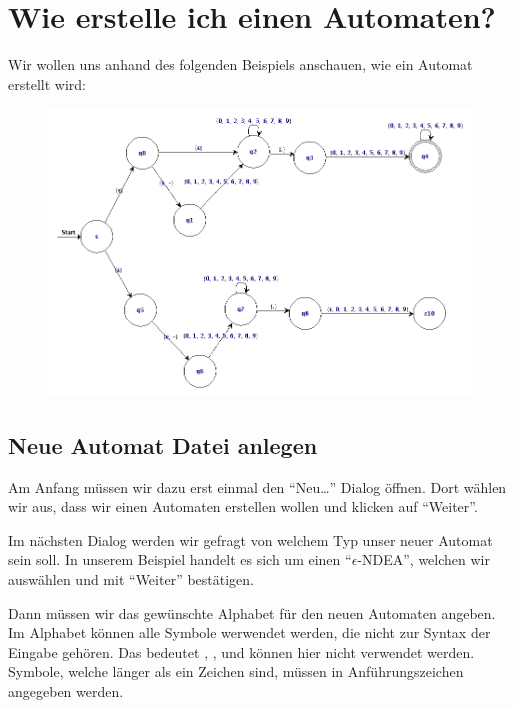 \chapter{Wie erstelle ich einen Automaten?}

Wir wollen uns anhand des folgenden Beispiels anschauen, wie ein Automat
erstellt wird:\vspace{10pt}

\begin{figure}[h]
\begin{center}
\includegraphics[width=12cm]{images/enfa_example.png}
\end{center}
\end{figure}

\section{Neue Automat Datei anlegen}

Am Anfang müssen wir dazu erst einmal den "`Neu\ldots"' Dialog öffnen. Dort
wählen wir aus, dass wir einen Automaten erstellen wollen und klicken
auf "`Weiter"'.\vspace{10pt}

Im nächsten Dialog werden wir gefragt von welchem Typ unser neuer
Automat sein soll. In unserem Beispiel handelt es sich um einen
"`$\epsilon$-NDEA"', welchen wir auswählen und mit "`Weiter"'
bestätigen.\vspace{10pt}

Dann müssen wir das gewünschte Alphabet für den neuen Automaten
angeben. Im Alphabet können alle Symbole werwendet werden, die nicht zur Syntax
der Eingabe gehören. Das bedeutet \Symbol{,}, \Symbol{\{}, \Symbol{\}} und
\SymbolEmpty{} können hier nicht verwendet werden. Symbole, welche länger als ein
Zeichen sind, müssen in Anführungszeichen angegeben werden.\vspace{10pt}

